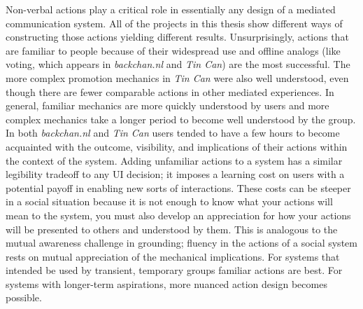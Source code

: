 Non-verbal actions play a critical role in essentially any design of a mediated communication system. All of the projects in this thesis show different ways of constructing those actions yielding different results. Unsurprisingly, actions that are familiar to people because of their widespread use and offline analogs (like voting, which appears in \emph{backchan.nl} and \emph{Tin Can}) are the most successful. The more complex promotion mechanics in \emph{Tin Can} were also well understood, even though there are fewer comparable actions in other mediated experiences. In general, familiar mechanics are more quickly understood by users and more complex mechanics take a longer period to become well understood by the group. In both \emph{backchan.nl} and \emph{Tin Can} users tended to have a few hours to become acquainted with the outcome, visibility, and implications of their actions within the context of the system. Adding unfamiliar actions to a system has a similar legibility tradeoff to any UI decision; it imposes a learning cost on users with a potential payoff in enabling new sorts of interactions. These costs can be steeper in a social situation because it is not enough to know what your actions will mean to the system, you must also develop an appreciation for how your actions will be presented to others and understood by them. This is analogous to the mutual awareness challenge in grounding; fluency in the actions of a social system rests on mutual appreciation of the mechanical implications. For systems that intended be used by transient, temporary groups familiar actions are best. For systems with longer-term aspirations, more nuanced action design becomes possible.

